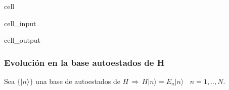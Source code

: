 \documentclass[letterpaper,10pt,english]{jupyterBook}
\newcommand{\ket}[1]{|#1\rangle}
\begin{document}
\begin{sphinxuseclass}{cell}
\begin{sphinxVerbatimInput}
\begin{sphinxuseclass}{cell_input}
\begin{sphinxVerbatim}[commandchars=\\\{\}]
  
\end{sphinxVerbatim}

\end{sphinxuseclass}\end{sphinxVerbatimInput}
\begin{sphinxVerbatimOutput}

\begin{sphinxuseclass}{cell_output}
\noindent{}

\end{sphinxuseclass}\end{sphinxVerbatimOutput}

\end{sphinxuseclass}

\subsubsection{Evolución en la base autoestados de H}
\label{\detokenize{docs/Part_01_Formalismo/Chapter_02_01_Fundamentos_MC_myst:evolucion-en-la-base-autoestados-de-h}}
\sphinxAtStartPar
Sea \(\{\ket{n}\}\) una base de autoestados de \(H \, \Rightarrow \,H \ket{n} = E_n \ket{n}~~~~n=1,..,N.\)
\end{document}
